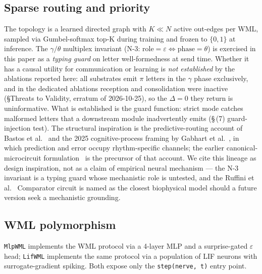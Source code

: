 \documentclass[10pt,twocolumn]{article}
\begin{document}
\subsection{Sparse routing and priority}
The topology is a learned directed graph with $K \ll N$ active
out-edges per WML, sampled via Gumbel-softmax top-K during training
and frozen to $\{0, 1\}$ at inference. The $\gamma / \theta$ multiplex
invariant (N-3: $\text{role}{=}\varepsilon \Leftrightarrow
\text{phase}{=}\theta$) is exercised in this paper as a \emph{typing
guard} on letter well-formedness at send time. Whether it has a
causal utility for communication or learning is \emph{not
established} by the ablations reported here: all substrates emit
$\pi$ letters in the $\gamma$ phase exclusively, and in the dedicated
ablations reception and consolidation were inactive (\S Threats to
Validity, erratum of 2026-10-25), so the $\Delta = 0$ they return is
uninformative. What is established is the guard function: strict mode
catches malformed letters that a downstream module inadvertently
emits (\S\,(7) guard-injection test). The structural inspiration is
the predictive-routing account of Bastos et
al.~\cite{bastos2020routing} and the 2025 cognitive-process framing by Gabhart et al.~\cite{gabhart2025predictive}, in
which prediction and error occupy rhythm-specific channels; the earlier
canonical-microcircuit formulation~\cite{bastos2012canonical} is the
precursor of that account. We cite this lineage as design inspiration,
not as a claim of empirical neural mechanism --- the N-3 invariant is a
typing guard whose mechanistic role is untested, and the Ruffini et
al.~\cite{ruffini2025comparator} Comparator circuit is named as the
closest biophysical model should a future version seek a mechanistic
grounding.

\subsection{WML polymorphism}
\texttt{MlpWML} implements the WML protocol via a 4-layer MLP and
a surprise-gated $\varepsilon$ head; \texttt{LifWML} implements the
same protocol via a population of LIF neurons with surrogate-gradient
spiking. Both expose only the \texttt{step(nerve, t)} entry point.
\end{document}
